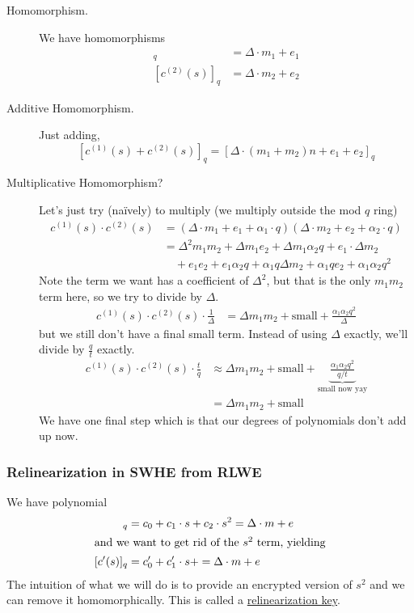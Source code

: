 \begin{description}
    \item[Homomorphism.] We have homomorphisms
        \begin{align*}
            [c^{(1)}(s)]_q & = \Delta\cdot m_1 + e_1 \\
            [c^{(2)}(s)]_q & = \Delta\cdot m_2 + e_2
        \end{align*}
    \item[Additive Homomorphism.] Just adding,
        \[[c^{(1)}(s) + c^{(2)}(s)]_q = [\Delta\cdot (m_1 + m_2)n + e_1 + e_2]_q\]
    \item[Multiplicative Homomorphism?] Let's just try (na\"ively) to multiply (we multiply outside the mod $q$ ring)
        \begin{align*}
            c^{(1)}(s) \cdot c^{(2)}(s)
             & = (\Delta\cdot m_1 + e_1 + \alpha_1\cdot q)(\Delta\cdot m_2 + e_2 + \alpha_2\cdot q)     \\
             & = \Delta^2 m_1m_2 + \Delta m_1e_2 + \Delta m_1\alpha_2q + e_1\cdot \Delta m_2            \\
             & \quad + e_1e_2 + e_1\alpha_2q + \alpha_1q\Delta m_2 + \alpha_1qe_2 + \alpha_1\alpha_2q^2
        \end{align*}
        Note the term we want has a coefficient of $\Delta^2$, but that is the only $m_1m_2$ term here, so we try to divide by $\Delta$.
        \begin{align*}
            c^{(1)}(s) \cdot c^{(2)}(s)\cdot \frac{1}{\Delta}
             & = \Delta m_1m_2 + \text{small} + \frac{\alpha_1\alpha_2q^2}{\Delta}
        \end{align*}
        but we still don't have a final small term. Instead of using $\Delta$ exactly, we'll divide by $\frac{q}{t}$ exactly.
        \begin{align*}
            c^{(1)}(s) \cdot c^{(2)}(s)\cdot \frac{t}{q}
             & \approx \Delta m_1m_2 + \text{small} + \underbrace{\frac{\alpha_1\alpha_2q^2}{q/t}}_{\text{small now yay}} \\
             & = \Delta m_1m_2 + \text{small}
        \end{align*}
        We have one final step which is that our degrees of polynomials don't add up now.
\end{description}


\subsubsection{Relinearization in SWHE from RLWE}
We have polynomial
\begin{align*}
    [c(s)]_q  & = c_0 + c_1\cdot s + c_2\cdot s^2 = \Delta \cdot m + e \\
    \intertext{and we want to get rid of the $s^2$ term, yielding}
    [c'(s)]_q & = c_0' + c_1'\cdot s + = \Delta \cdot m + e
\end{align*}
The intuition of what we will do is to provide an encrypted version of $s^2$ and we can remove it homomorphically. This is called a \ul{relinearization key}.

